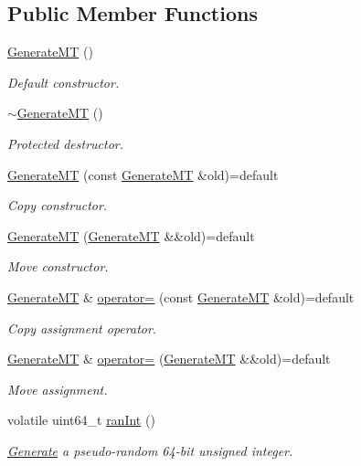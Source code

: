 \subsection*{Public Member Functions}
\begin{DoxyCompactItemize}
\item 
\hyperlink{classvarfiles_1_1_generate_m_t_a733ee504a952b6d7ad997a1cd30caf45}{Generate\+MT} ()
\begin{DoxyCompactList}\small\item\em Default constructor. \end{DoxyCompactList}\item 
\mbox{\label{classvarfiles_1_1_generate_m_t_ad280e9aaf71c42b83656229e01e894b4}} 
\hyperlink{classvarfiles_1_1_generate_m_t_ad280e9aaf71c42b83656229e01e894b4}{$\sim$\+Generate\+MT} ()
\begin{DoxyCompactList}\small\item\em Protected destructor. \end{DoxyCompactList}\item 
\hyperlink{classvarfiles_1_1_generate_m_t_a2e509a1e23c2e4b5e4424e53cafe8a06}{Generate\+MT} (const \hyperlink{classvarfiles_1_1_generate_m_t}{Generate\+MT} \&old)=default
\begin{DoxyCompactList}\small\item\em Copy constructor. \end{DoxyCompactList}\item 
\hyperlink{classvarfiles_1_1_generate_m_t_ad49a2c6b3e08990dfb1134e8abaff3b6}{Generate\+MT} (\hyperlink{classvarfiles_1_1_generate_m_t}{Generate\+MT} \&\&old)=default
\begin{DoxyCompactList}\small\item\em Move constructor. \end{DoxyCompactList}\item 
\hyperlink{classvarfiles_1_1_generate_m_t}{Generate\+MT} \& \hyperlink{classvarfiles_1_1_generate_m_t_afe8f81d55be1fff8dc00c92d161c6ffb}{operator=} (const \hyperlink{classvarfiles_1_1_generate_m_t}{Generate\+MT} \&old)=default
\begin{DoxyCompactList}\small\item\em Copy assignment operator. \end{DoxyCompactList}\item 
\hyperlink{classvarfiles_1_1_generate_m_t}{Generate\+MT} \& \hyperlink{classvarfiles_1_1_generate_m_t_ab45dcefe5be9e5e794a9a4a2e94b3687}{operator=} (\hyperlink{classvarfiles_1_1_generate_m_t}{Generate\+MT} \&\&old)=default
\begin{DoxyCompactList}\small\item\em Move assignment. \end{DoxyCompactList}\item 
volatile uint64\+\_\+t \hyperlink{classvarfiles_1_1_generate_m_t_a500e163265b6fdae0a30fdacc1c37f80}{ran\+Int} ()
\begin{DoxyCompactList}\small\item\em \hyperlink{classvarfiles_1_1_generate}{Generate} a pseudo-\/random 64-\/bit unsigned integer. \end{DoxyCompactList}\end{DoxyCompactItemize}
